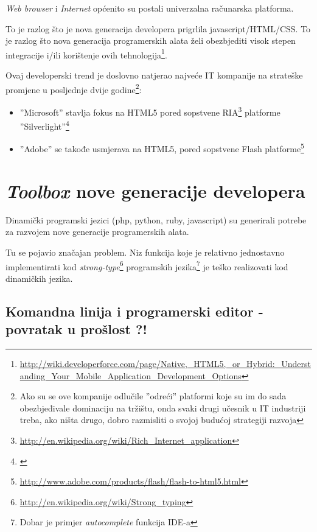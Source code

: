 \documentclass[times, utf8, seminar]{fit}
\begin{document}
\emph{Web browser} i \emph{Internet} općenito su postali univerzalna računarska platforma. 

To je razlog što je nova generacija developera prigrlila javascript/HTML/CSS. To je razlog što nova generacija programerskih alata želi obezbjediti visok stepen integracije i/ili korištenje ovih tehnologija\footnote{\url{http://wiki.developerforce.com/page/Native,_HTML5,_or_Hybrid:_Understanding_Your_Mobile_Application_Development_Options}}.

Ovaj developerski trend je doslovno natjerao najveće IT kompanije na strateške promjene u posljednje dvije godine\footnote{Ako su se ove kompanije odlučile ''odreći'' platformi koje su im do sada obezbjeđivale dominaciju na tržištu, onda svaki drugi učesnik u IT industriji treba, ako ništa drugo, dobro razmisliti o svojoj budućoj strategiji razvoja}: 
\begin{itemize}
  \item ''Microsoft'' stavlja fokus na HTML5 pored sopstvene RIA\footnote{\url{http://en.wikipedia.org/wiki/Rich_Internet_application}} platforme ''Silverlight''\footnote{\href{http://www.technologyreview.com/view/426083/html5-triumphant-silverlight-flash-discontinuing}{\color{blue}{Trijumf HTML5 nad zatvorenim vendorskim tehnologijama}}}
  \item ''Adobe'' se takođe usmjerava na HTML5, pored sopstvene Flash platforme\footnote{\url{http://www.adobe.com/products/flash/flash-to-html5.html}}

\end{itemize}

\chapter{\emph{Toolbox} nove generacije developera}

Dinamički programski jezici (php, python, ruby, javascript) su generirali potrebe za razvojem nove generacije programerskih alata. 

Tu se pojavio značajan problem. Niz funkcija koje je relativno jednostavno implementirati kod \emph{strong-type}\footnote{\url{http://en.wikipedia.org/wiki/Strong_typing}} programskih jezika\footnote{Dobar je primjer \emph{autocomplete} funkcija IDE-a} je teško realizovati kod dinamičkih jezika.

\section{Komandna linija i programerski editor - povratak u prošlost ?!}
\end{document}
